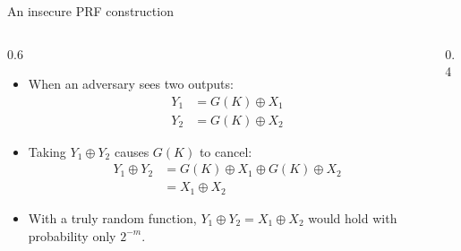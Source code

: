 \ifdefined\PRESENTATION\else\PassOptionsToClass{handout}{beamer}\fi\documentclass[aspectratio=169, lualatex]{beamer}
\begin{document}
\begin{frame}{An insecure PRF construction}
	\begin{columns}[c]
		\begin{column}{0.6\textwidth}
			\begin{itemize}
				\item When an adversary sees two outputs:
				      \begin{align*}
					      Y_1 & = G(K) \oplus X_1 \\
					      Y_2 & = G(K) \oplus X_2
				      \end{align*}
				\item Taking $Y_1 \oplus Y_2$ causes $G(K)$ to cancel:
				      \begin{align*}
					      Y_1 \oplus Y_2 & = G(K) \oplus X_1 \oplus G(K) \oplus X_2 \\
					                     & = X_1 \oplus X_2
				      \end{align*}
				\item With a truly random function, $Y_1 \oplus Y_2 = X_1 \oplus X_2$ would hold with probability only $2^{-m}$.
			\end{itemize}
		\end{column}
		\begin{column}{0.4\textwidth}
			\begin{center}
			\end{center}
		\end{column}
	\end{columns}
\end{frame}
\end{document}
